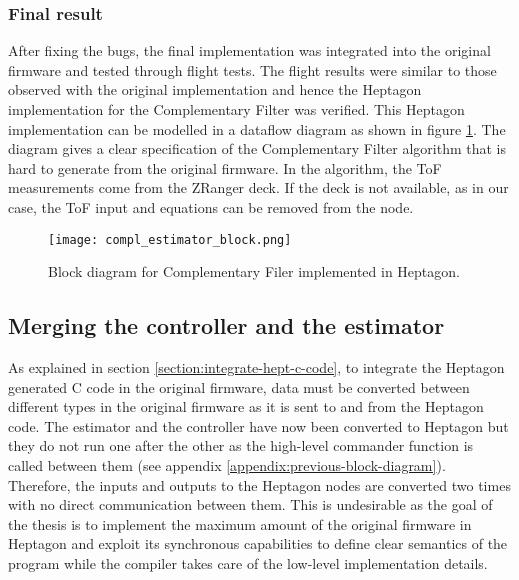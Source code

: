 \documentclass[10pt, a4paper]{article}
\begin{document}
    \subsubsection{Final result}
    After fixing the bugs, the final implementation was integrated into the original firmware and tested through flight tests. The flight results were similar to those observed with the original implementation and hence the Heptagon implementation for the Complementary Filter was verified. This Heptagon implementation can be modelled in a dataflow diagram as shown in figure \ref{figure:compl_estimator}. The diagram gives a clear specification of the Complementary Filter algorithm that is hard to generate from the original firmware. In the algorithm, the ToF measurements come from the ZRanger deck. If the deck is not available, as in our case, the ToF input and equations can be removed from the node.

    \begin{figure}[hbt!]
        \centering
        \texttt{[image: compl\_estimator\_block.png]}
        \caption{Block diagram for Complementary Filer implemented in Heptagon.}
        \label{figure:compl_estimator}
    \end{figure}

    \subsection{Merging the controller and the estimator}
    \label{section:controller-estimator-merging}
    As explained in section \ref{section:integrate-hept-c-code}, to integrate the Heptagon generated C code in the original firmware, data must be converted between different types in the original firmware as it is sent to and from the Heptagon code. The estimator and the controller have now been converted to Heptagon but they do not run one after the other as the high-level commander function is called between them (see appendix \ref{appendix:previous-block-diagram}). Therefore, the inputs and outputs to the Heptagon nodes are converted two times with no direct communication between them. This is undesirable as the goal of the thesis is to implement the maximum amount of the original firmware in Heptagon and exploit its synchronous capabilities to define clear semantics of the program while the compiler takes care of the low-level implementation details.
\end{document}
